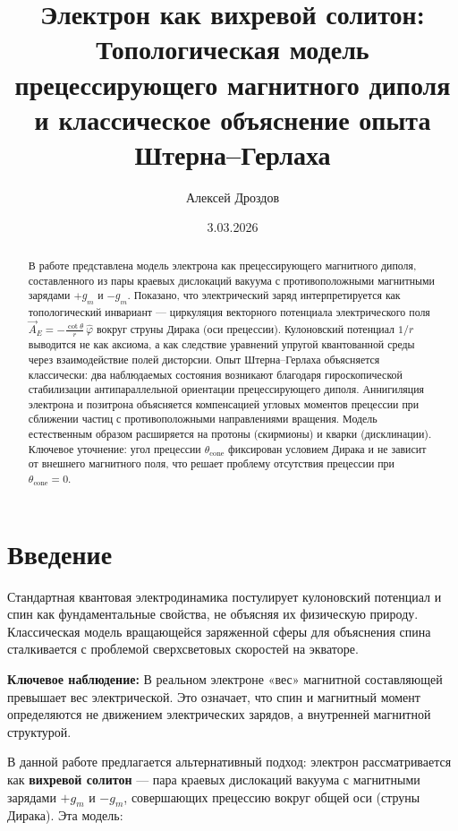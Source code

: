 \documentclass[12pt]{article}
\title{Электрон как вихревой солитон: \\ Топологическая модель прецессирующего магнитного диполя и классическое объяснение опыта Штерна–Герлаха}
\author{Алексей Дроздов}
\date{3.03.2026}
\begin{document}
\maketitle

\begin{abstract}
В работе представлена модель электрона как прецессирующего магнитного диполя, составленного из пары краевых дислокаций вакуума с противоположными магнитными зарядами $+g_m$ и $-g_m$. Показано, что электрический заряд интерпретируется как топологический инвариант — циркуляция векторного потенциала электрического поля $\vec{A}_E = -\frac{\cot\theta}{r}\,\hat{\varphi}$ вокруг струны Дирака (оси прецессии). Кулоновский потенциал $1/r$ выводится не как аксиома, а как следствие уравнений упругой квантованной среды через взаимодействие полей дисторсии. Опыт Штерна–Герлаха объясняется классически: два наблюдаемых состояния возникают благодаря гироскопической стабилизации антипараллельной ориентации прецессирующего диполя. Аннигиляция электрона и позитрона объясняется компенсацией угловых моментов прецессии при сближении частиц с противоположными направлениями вращения. Модель естественным образом расширяется на протоны (скирмионы) и кварки (дисклинации). Ключевое уточнение: угол прецессии $\theta_{\text{cone}}$ фиксирован условием Дирака и не зависит от внешнего магнитного поля, что решает проблему отсутствия прецессии при $\theta_{\text{cone}} = 0$.
\end{abstract}

\section{Введение}

Стандартная квантовая электродинамика постулирует кулоновский потенциал и спин как фундаментальные свойства, не объясняя их физическую природу. Классическая модель вращающейся заряженной сферы для объяснения спина сталкивается с проблемой сверхсветовых скоростей на экваторе.

\textbf{Ключевое наблюдение:} В реальном электроне «вес» магнитной составляющей превышает вес электрической. Это означает, что спин и магнитный момент определяются не движением электрических зарядов, а внутренней магнитной структурой.

В данной работе предлагается альтернативный подход: электрон рассматривается как \textbf{вихревой солитон} — пара краевых дислокаций вакуума с магнитными зарядами $+g_m$ и $-g_m$, совершающих прецессию вокруг общей оси (струны Дирака). Эта модель:
\end{document}
